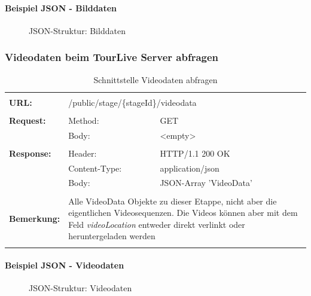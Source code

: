 \paragraph{Beispiel JSON - Bilddaten}
\begin{figure}[H]
	\centering
	
	\caption{JSON-Struktur: Bilddaten}
\end{figure}

\newpage
\subsubsection{Videodaten beim TourLive Server abfragen}
\begin{longtable}{ p{2.5cm} || p{3.5cm} p{5.5cm}}
&  \\ [-1.5ex]
	\textbf{URL:} & \multicolumn{2}{l}{/public/stage/\{stageId\}/videodata}  \\ [1ex] \hline & &  \\ [-1.5ex]
	\textbf{Request:} & Method: & GET \\
		& Body: & <empty> \\ [1ex] \hline & &  \\ [-1.5ex]
	\textbf{Response:} &  Header: & HTTP/1.1 200 OK \\
		& Content-Type: & application/json \\
		& Body: & JSON-Array 'VideoData' \\ [1ex] \hline & &  \\ [-1.5ex]
	\textbf{Bemerkung:} & \multicolumn{2}{p{9cm}}{Alle VideoData Objekte zu dieser Etappe, nicht aber die eigentlichen Videosequenzen. Die Videos können aber mit dem Feld \textit{videoLocation} entweder direkt verlinkt oder heruntergeladen werden} \\ [1ex] 
\caption{Schnittstelle Videodaten abfragen}
\end{longtable}

\paragraph{Beispiel JSON - Videodaten}
\begin{figure}[H]
	\centering
	
	\caption{JSON-Struktur: Videodaten}
\end{figure}

\newpage
